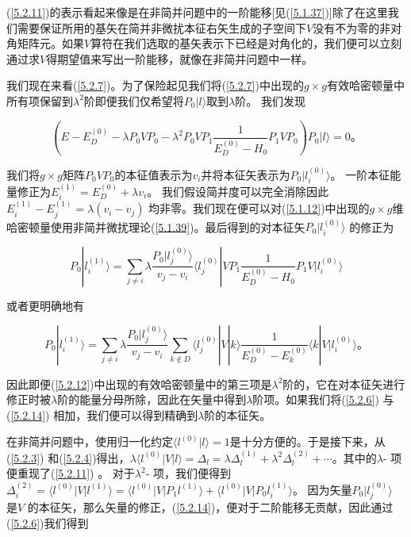 ﻿\documentclass[UTF8,twoside]{ctexart}
\begin{document}
(\ref{5.2.11})的表示看起来像是在非简并问题中的一阶能移[见(\ref{5.1.37})]除了在这里我们需要保证所用的基矢在简并非微扰本征右矢生成的子空间下$V$没有不为零的非对角矩阵元。如果$V$算符在我们选取的基矢表示下已经是对角化的，我们便可以立刻通过求$V$得期望值来写出一阶能移，就像在非简并问题中一样。

我们现在来看(\ref{5.2.7})。为了保险起见我们将(\ref{5.2.7})中出现的$g\times g$有效哈密顿量中所有项保留到$\lambda^2$阶即便我们仅希望将$P_0|l\rangle$取到$\lambda$阶。 我们发现

\begin{equation} \label{5.2.12}
\left(E-E_D^{(0)}-\lambda P_0 V P_0-\lambda^2 P_0 V P_1\dfrac{1}{E_D^{(0)}-H_0}P_1 V P_0\right)P_0|l\rangle = 0\text{。}
\end{equation}

\noindent 我们将$g\times g$矩阵$P_0VP_0$的本征值表示为$v_i$并将本征矢表示为$P_0|l_i^{(0)}\rangle$。 一阶本征能量修正为$E_i^{(1)}=E_D^{(0)}+\lambda v_i$。 我们假设简并度可以完全消除因此$E_i^{(1)}-E_j^{(1)}=\lambda(v_i-v_j)$ 均非零。我们现在便可以对(\ref{5.1.12})中出现的$g\times g$维哈密顿量使用非简并微扰理论(\ref{5.1.39})。最后得到的对本征矢$P_0|l_i^{(0)}\rangle$ 的修正为

\begin{equation} \label{5.2.13}
P_0|l_i^{(1)}\rangle=\displaystyle\sum_{j\neq i}\lambda\dfrac{P_0|l_j^{(0)}\rangle}{v_j-v_i}\langle l_j^{(0)}|VP_1\dfrac{1}{E_D^{(0)}-H_0}P_1V|l_i^{(0)}\rangle
\end{equation}

\noindent 或者更明确地有

\begin{equation} \label{5.2.14}
P_0|l_i^{(1)}\rangle=\displaystyle\sum_{j\neq i} \lambda\dfrac{P_0|l_j^{(0)}\rangle}{v_j-v_i}\displaystyle\sum_{k\not\in D}\langle l_j^{(0)}|V|k\rangle\dfrac{1}{E_D^{(0)}-E_k^{(0)}}\langle k|V|l_i^{(0)}\rangle\text{。}
\end{equation}

\noindent 因此即便(\ref{5.2.12})中出现的有效哈密顿量中的第三项是$\lambda^2$阶的，它在对本征矢进行修正时被$\lambda$阶的能量分母所除，因此在矢量中得到$\lambda$阶项。如果我们将(\ref{5.2.6}) 与(\ref{5.2.14}) 相加，我们便可以得到精确到$\lambda$阶的本征矢。

在非简并问题中，使用归一化约定$\langle l^{(0)}|l\rangle=1$是十分方便的。于是接下来，从(\ref{5.2.3}) 和(\ref{5.2.4})得出，$\lambda\langle l^{(0)}|V|l\rangle=\Delta_l=\lambda \Delta_l^{(1)}+\lambda^2\Delta_l^{(2)}+\cdots$。其中的$\lambda$- 项便重现了(\ref{5.2.11}) 。 对于$\lambda^2$- 项，我们便得到$\Delta_i^{(2)}=\langle l^{(0)}|V|l^{(1)}\rangle=\langle l^{(0)}|V|P_1 l^{(1)}\rangle+\langle l^{(0)}|V|P_0 l_i^{(1)}\rangle$。 因为矢量$P_0 |l_j^{(0)}\rangle$ 是$V$ 的本征矢，那么矢量的修正，(\ref{5.2.14})，便对于二阶能移无贡献，因此通过(\ref{5.2.6})我们得到
\end{document}
